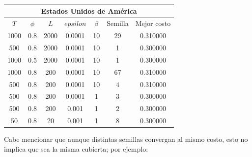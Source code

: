 \documentclass{article}
\begin{document}
  \begin{center}
    \begin{tabular}{|c|c|c|c|c|c|c|}
      \hline
      \multicolumn{7}{|c|}{Estados Unidos de América}                    \\
      \hline
      $T$  & $\phi$ & $L$  & $epsilon$ & $\beta$ & Semilla & Mejor costo \\
      1000 & 0.8    & 2000 & 0.0001    & 10      & 29      & 0.310000    \\
      500  & 0.8    & 2000 & 0.0001    & 10      & 1       & 0.300000    \\
      1000 & 0.5    & 2000 & 0.0001    & 10      & 1       & 0.300000    \\
      1000 & 0.8    & 200  & 0.0001    & 10      & 67      & 0.310000    \\
      500  & 0.8    & 200  & 0.0001    & 10      & 4       & 0.310000    \\
      500  & 0.8    & 200  & 0.0001    & 1       & 3       & 0.300000    \\
      500  & 0.8    & 200  & 0.001     & 1       & 2       & 0.300000    \\
      50   & 0.8    & 20   & 0.001     & 1       & 8       & 0.300000    \\
      \hline
    \end{tabular}
  \end{center}

  Cabe mencionar que aunque distintas semillas convergan al mismo costo,
  esto no implica que sea la misma cubierta; por ejemplo:
\end{document}
